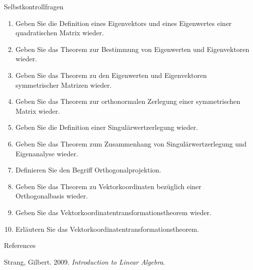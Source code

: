 \documentclass[
  8pt,
  ignorenonframetext,
]{beamer}
\newlength{\cslhangindent}
\newlength{\cslentryspacingunit} %
\newenvironment{CSLReferences}[2] %
 {%
  \setlength{\parindent}{0pt}
  \ifodd #1
  \let\oldpar\par
  \def\par{\hangindent=\cslhangindent\oldpar}
  \fi
  \setlength{\parskip}{#2\cslentryspacingunit}
 }%
 {}
\begin{document}
\begin{frame}{Selbstkontrollfragen}
\protect\hypertarget{selbstkontrollfragen}{}
\footnotesize
{}
\begin{enumerate}
\item Geben Sie die Definition eines Eigenvektors und eines Eigenwertes einer quadratischen Matrix wieder.
\item Geben Sie das Theorem zur Bestimmung von Eigenwerten und Eigenvektoren wieder.
\item Geben Sie das Theorem zu den Eigenwerten und Eigenvektoren symmetrischer Matrizen wieder.
\item Geben Sie das Theorem zur orthonormalen Zerlegung einer symmetrischen Matrix wieder.
\item Geben Sie die Definition einer Singulärwertzerlegung wieder.
\item Geben Sie das Theorem zum Zusammenhang von Singulärwertzerlegung und Eigenanalyse wieder.
\item Definieren Sie den Begriff Orthogonalprojektion.
\item Geben Sie das Theorem zu Vektorkoordinaten bezüglich einer Orthogonalbasis wieder.
\item Geben Sie das Vektorkoordinatentransformationstheorem wieder.
\item Erläutern Sie das Vektorkoordinatentransformationstheorem.
\end{enumerate}
\end{frame}

\begin{frame}{References}
\protect\hypertarget{references}{}
\footnotesize

\hypertarget{refs}{}
\begin{CSLReferences}{1}{0}
\leavevmode{}%
Strang, Gilbert. 2009. \emph{Introduction to {Linear Algebra}}.

\end{CSLReferences}
\end{frame}
\end{document}
